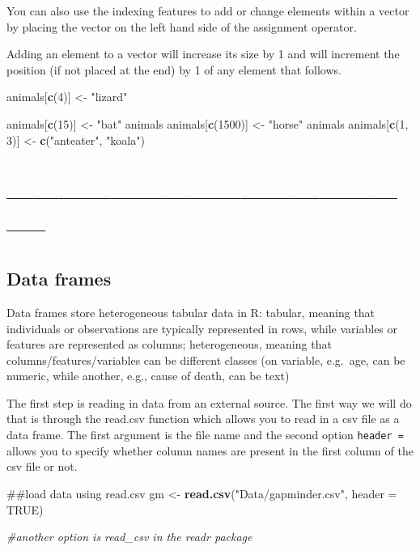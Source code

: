 \documentclass[]{article}
\newenvironment{Shaded}{\begin{snugshade}}{\end{snugshade}}
\newcommand{\KeywordTok}[1]{\textcolor[rgb]{0.13,0.29,0.53}{\textbf{{#1}}}}
\newcommand{\DataTypeTok}[1]{\textcolor[rgb]{0.13,0.29,0.53}{{#1}}}
\newcommand{\DecValTok}[1]{\textcolor[rgb]{0.00,0.00,0.81}{{#1}}}
\newcommand{\StringTok}[1]{\textcolor[rgb]{0.31,0.60,0.02}{{#1}}}
\newcommand{\CommentTok}[1]{\textcolor[rgb]{0.56,0.35,0.01}{\textit{{#1}}}}
\newcommand{\OtherTok}[1]{\textcolor[rgb]{0.56,0.35,0.01}{{#1}}}
\newcommand{\NormalTok}[1]{{#1}}
\begin{document}
You can also use the indexing features to add or change elements within
a vector by placing the vector on the left hand side of the assignment
operator.

Adding an element to a vector will increase its size by 1 and will
increment the position (if not placed at the end) by 1 of any element
that follows.

\begin{Shaded}
\begin{Highlighting}[]
\NormalTok{animals[}\KeywordTok{c}\NormalTok{(}\DecValTok{4}\NormalTok{)] <-}\StringTok{ "lizard"}

\NormalTok{animals[}\KeywordTok{c}\NormalTok{(}\DecValTok{15}\NormalTok{)] <-}\StringTok{ "bat"}
\NormalTok{animals}
\NormalTok{animals[}\KeywordTok{c}\NormalTok{(}\DecValTok{1500}\NormalTok{)] <-}\StringTok{ "horse"}
\NormalTok{animals}
\NormalTok{animals[}\KeywordTok{c}\NormalTok{(}\DecValTok{1}\NormalTok{, }\DecValTok{3}\NormalTok{)] <-}\StringTok{ }\KeywordTok{c}\NormalTok{(}\StringTok{"anteater"}\NormalTok{, }\StringTok{"koala"}\NormalTok{)}
\end{Highlighting}
\end{Shaded}

\section{--------------------------------------------------}\label{section-3}

\subsection{Data frames}\label{data-frames}

Data frames store heterogeneous tabular data in R: tabular, meaning that
individuals or observations are typically represented in rows, while
variables or features are represented as columns; heterogeneous, meaning
that columns/features/variables can be different classes (on variable,
e.g.~age, can be numeric, while another, e.g., cause of death, can be
text)

The first step is reading in data from an external source. The first way
we will do that is through the read.csv function which allows you to
read in a csv file as a data frame. The first argument is the file name
and the second option \texttt{header\ =} allows you to specify whether
column names are present in the first column of the csv file or not.

\begin{Shaded}
\begin{Highlighting}[]
\NormalTok{##load data using read.csv}
 \NormalTok{gm <-}\StringTok{ }\KeywordTok{read.csv}\NormalTok{(}\StringTok{"Data/gapminder.csv"}\NormalTok{, }\DataTypeTok{header =} \OtherTok{TRUE}\NormalTok{)}
 
\CommentTok{#another option is read_csv in the readr package}
\end{Highlighting}
\end{Shaded}
\end{document}

